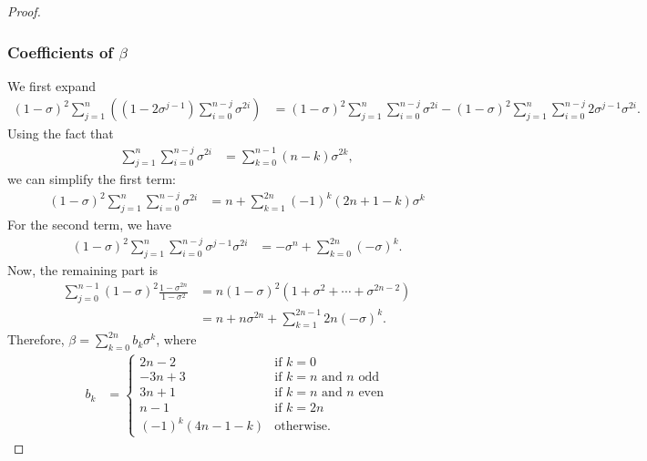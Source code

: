 \documentclass{article}
\theoremstyle{plain}
\theoremstyle{definition}
\theoremstyle{remark}
\def\bigopen#1{\left(#1\right)}
\begin{document}
\begin{proof}
\subsubsection*{Coefficients of $\beta$}
We first expand \begin{align*}
    (1-\sigma)^2\sum_{j=1}^n \bigopen{ (1-2\sigma^{j-1})\sum_{i=0}^{n-j}\sigma^{2i} } &= (1-\sigma)^2 \sum_{j=1}^n \sum_{i=0}^{n-j}\sigma^{2i} - (1-\sigma)^2\sum_{j=1}^n \sum_{i=0}^{n-j} 2\sigma^{j-1} \sigma^{2i}.
\end{align*}
Using the fact that
\begin{align*}
    \sum_{j=1}^n \sum_{i=0}^{n-j}\sigma^{2i} &= \sum_{k=0}^{n-1} (n-k) \sigma^{2k},
\end{align*}
we can simplify the first term: \begin{align*}
    (1-\sigma)^2 \sum_{j=1}^n \sum_{i=0}^{n-j}\sigma^{2i} &= n + \sum_{k=1}^{2n} (-1)^k (2n+1-k) \sigma^k
\end{align*}
For the second term, we have \begin{align*}
    (1-\sigma)^2 \sum_{j=1}^n \sum_{i=0}^{n-j} \sigma^{j-1} \sigma^{2i} &= -\sigma^n + \sum_{k=0}^{2n} (-\sigma)^k.
\end{align*}
Now, the remaining part is 
\begin{align*}
    \sum_{j=0}^{n-1} (1-\sigma)^2 \frac{1-\sigma^{2n}}{1-\sigma^2} &= n(1-\sigma)^2 \bigopen{1+\sigma^2+\cdots+\sigma^{2n-2}}\\
    &= n + n\sigma^{2n} + \sum_{k=1}^{2n-1} 2n(-\sigma)^k.
\end{align*}
Therefore, $\beta = \sum_{k=0}^{2n} b_{k}\sigma^k$, where
\begin{align*}
    b_k &= 
    \begin{cases}
        2n - 2 &\text{if } k = 0 \\
        -3n + 3 &\text{if } k = n \text{ and } n \text{ odd} \\
        3n + 1 &\text{if } k = n \text{ and } n \text{ even} \\
        n - 1 &\text{if } k = 2n \\
        (-1)^k (4n - 1 - k) &\text{otherwise.}
    \end{cases}
\end{align*}


\end{proof}
\end{document}
